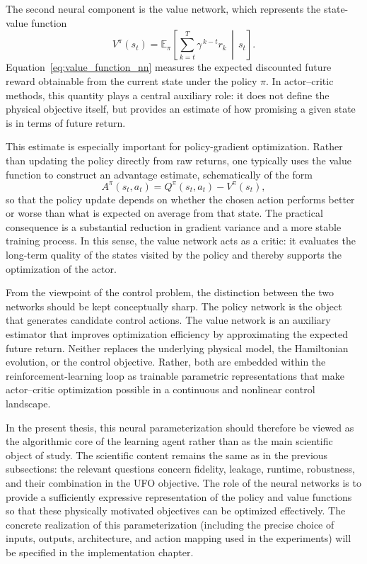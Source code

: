 The second neural component is the value network, which represents the state-value function
\begin{equation}
V^{\pi}(s_t)
=
\mathbb{E}_{\pi}
\left[
\sum_{k=t}^{T} \gamma^{\,k-t} r_k
\,\middle|\,
s_t
\right].
\label{eq:value_function_nn}
\end{equation}
Equation~\eqref{eq:value_function_nn} measures the expected discounted future reward obtainable from the current state under the policy \(\pi\). In actor--critic methods, this quantity plays a central auxiliary role: it does not define the physical objective itself, but provides an estimate of how promising a given state is in terms of future return.

This estimate is especially important for policy-gradient optimization. Rather than updating the policy directly from raw returns, one typically uses the value function to construct an advantage estimate, schematically of the form
\begin{equation}
A^{\pi}(s_t,a_t) = Q^{\pi}(s_t,a_t) - V^{\pi}(s_t),
\label{eq:advantage_nn}
\end{equation}
so that the policy update depends on whether the chosen action performs better or worse than what is expected on average from that state. The practical consequence is a substantial reduction in gradient variance and a more stable training process. In this sense, the value network acts as a critic: it evaluates the long-term quality of the states visited by the policy and thereby supports the optimization of the actor.

From the viewpoint of the control problem, the distinction between the two networks should be kept conceptually sharp. The policy network is the object that generates candidate control actions. The value network is an auxiliary estimator that improves optimization efficiency by approximating the expected future return. Neither replaces the underlying physical model, the Hamiltonian evolution, or the control objective. Rather, both are embedded within the reinforcement-learning loop as trainable parametric representations that make actor--critic optimization possible in a continuous and nonlinear control landscape.

In the present thesis, this neural parameterization should therefore be viewed as the algorithmic core of the learning agent rather than as the main scientific object of study. The scientific content remains the same as in the previous subsections: the relevant questions concern fidelity, leakage, runtime, robustness, and their combination in the UFO objective. The role of the neural networks is to provide a sufficiently expressive representation of the policy and value functions so that these physically motivated objectives can be optimized effectively. The concrete realization of this parameterization (including the precise choice of inputs, outputs, architecture, and action mapping used in the experiments) will be specified in the implementation chapter.

